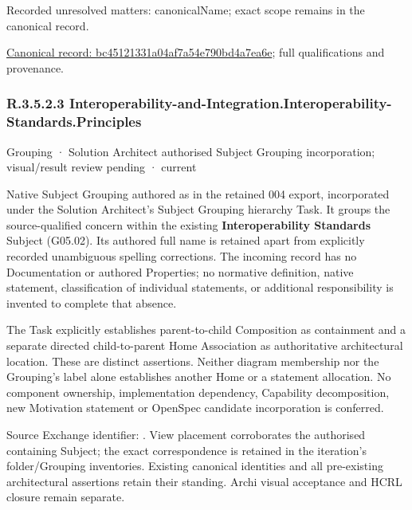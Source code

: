 {\small Recorded unresolved matters: canonicalName; exact scope remains in the canonical record.}\par
{\footnotesize \href{../../../../continuum/grouping/bc45121331a04af7a54e790bd4a7ea6e.md}{Canonical record: bc45121331a04af7a54e790bd4a7ea6e}; full qualifications and provenance.}\par
\subsubsection*{R.3.5.2.3 Interoperability-and-Integration.Interoperability-Standards.Principles}
\label{navigation:R.3.5.2.3}

\label{element:db0cac8c53b7404b8f2c17a542db7604}
{\small Grouping · Solution Architect authorised Subject Grouping incorporation; visual/result review pending · current}\par

Native Subject Grouping authored as \texttt{} in the retained 004 export,
incorporated under the Solution Architect's Subject Grouping hierarchy Task.
It groups the source-qualified \texttt{} concern within
the existing \textbf{Interoperability Standards} Subject (G05.02). Its authored full name
is retained apart from explicitly recorded unambiguous spelling corrections.
The incoming record has no Documentation or authored Properties; no normative
definition, native statement, classification of individual statements, or
additional responsibility is invented to complete that absence.



The Task explicitly establishes parent-to-child Composition as containment and
a separate directed child-to-parent Home Association as authoritative architectural
location. These are distinct assertions. Neither diagram membership nor the
Grouping's label alone establishes another Home or a statement allocation.
No component ownership, implementation dependency, Capability decomposition,
new Motivation statement or OpenSpec candidate incorporation is conferred.



Source Exchange identifier: \texttt{}. View placement corroborates
the authorised containing Subject; the exact correspondence is retained in the
iteration's folder/Grouping inventories. Existing canonical identities and all
pre-existing architectural assertions retain their standing. Archi visual
acceptance and HCRL closure remain separate.


